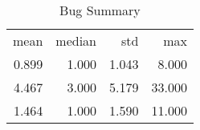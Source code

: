 \begin{table}[ht]
\centering
\caption{Bug Summary} 
\begin{tabular}{rrrr}
 mean & median & std & max \\ 
 0.899 & 1.000 & 1.043 & 8.000 \\ 
   \hline
4.467 & 3.000 & 5.179 & 33.000 \\ 
  1.464 & 1.000 & 1.590 & 11.000 \\ 
  \end{tabular}
  \label{tab:sumBugs}
\end{table}
